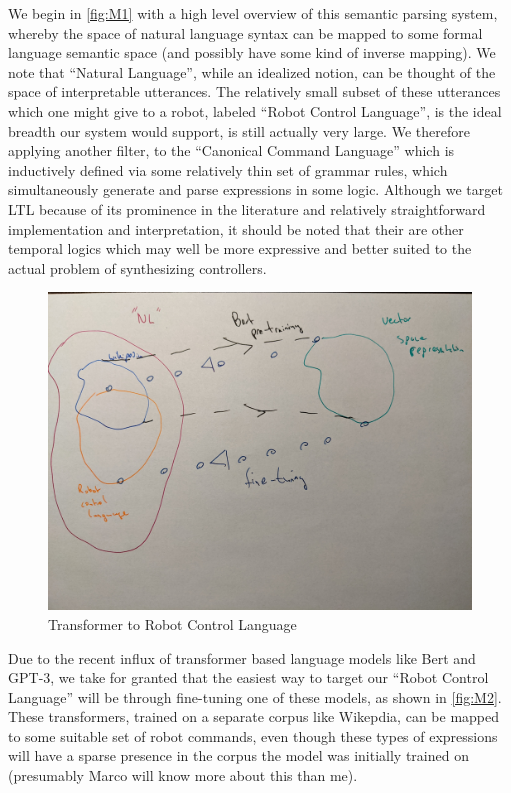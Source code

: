 \documentclass[a4paper, 11pt]{article}
\begin{document}
We begin in \autoref{fig:M1} with a high level overview of this semantic parsing
system, whereby the space of natural language syntax can be mapped to some
formal language semantic space (and possibly have some kind of inverse mapping).
We note that ``Natural Language'', while an idealized notion, can be thought of
the space of interpretable utterances. The relatively small subset of these
utterances which one might give to a robot, labeled ``Robot Control Language'',
is the ideal breadth our system would support, is still actually very large. We
therefore applying another filter, to the ``Canonical Command Language'' which
is inductively defined via some relatively thin set of grammar rules, which
simultaneously generate and parse expressions in some logic. Although we target
LTL because of its prominence in the literature and relatively straightforward
implementation and interpretation, it should be noted that their are other
temporal logics which may well be more expressive and better suited to the
actual problem of synthesizing controllers.

\begin{figure}
\centering
\includegraphics[width=150mm]{pics/two.jpg}
\caption{Transformer to Robot Control Language}\label{fig:M2}
\end{figure}

Due to the recent influx of transformer based language models like Bert and
GPT-3, we take for granted that the easiest way to target our ``Robot Control
Language'' will be through fine-tuning one of these models, as shown in
\autoref{fig:M2}. These transformers, trained on a separate corpus like
Wikepdia, can be mapped to some suitable set of robot commands, even though
these types of expressions will have a sparse presence in the corpus the model
was initially trained on (presumably Marco will know more about this than me).
\end{document}

